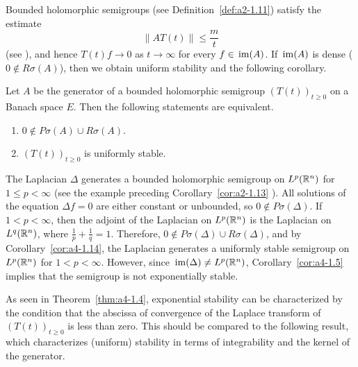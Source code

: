 Bounded holomorphic semigroups (see Definition~\ref{def:a2-1.11}) satisfy the estimate
\[\|AT(t)\| \leq \frac{m}{t}\]
(see \textcite[p.33]{goldstein:1985a}), and hence $T(t)f \to 0$ as $t \to \infty$
for every $f \in \mathop{}\mathrm{im}(A)$. 
If\/ $\mathop{}\mathrm{im}(A)$ is dense (\ie $0 \not\in R\sigma(A)$), then we obtain
uniform stability and the following corollary.
\begin{corollary}\label{cor:a4-1.14}
Let $A$ be the generator of a bounded holomorphic
semigroup $(T(t))_{t \geq 0}$ on a Banach space $E$. 
Then the following statements are equivalent.
\begin{enumerate}[\upshape (a)]
\item 
$0 \not\in P\sigma(A) \cup R\sigma(A)$.

\item 
$(T(t))_{t \geq 0}$ is uniformly stable.

\end{enumerate}
\end{corollary}
\begin{example}\label{ex:a4-15}
The Laplacian $\Delta$ generates a bounded holomorphic semigroup on $L^{p}(\mathbb{R}^{n})$ for $1 \leq p < \infty$ (see the example preceding
Corollary~\ref{cor:a2-1.13} ).
All solutions of the equation $\Delta f = 0$ are either constant
or unbounded, so $0 \not\in P\sigma(\Delta)$. 
If\/ $1 < p < \infty$, then the adjoint
of the Laplacian on $L^{p}(\mathbb{R}^{n})$ is the Laplacian on $L^{q}(\mathbb{R}^{n})$, where
$\frac{1}{p} + \frac{1}{q} = 1$. 
Therefore, $0 \not\in P\sigma(\Delta) \cup R\sigma(\Delta)$, and by Corollary~\ref{cor:a4-1.14},
the Laplacian generates a uniformly stable semigroup on  $L^{p}(\mathbb{R}^{n})$
for $1 < p < \infty$. However, since $\mathop{}\mathrm{im}( \Delta) \not= L^{p}(\mathbb{R}^{n})$, Corollary~\ref{cor:a4-1.5} implies that the semigroup is not exponentially stable. %
\end{example}
As seen in Theorem~\ref{thm:a4-1.4}, exponential stability can be characterized by the condition that the abscissa of convergence of the Laplace transform of\/ $(T(t))_{t \geq 0}$ is less than zero. 
This should be compared to the following result, which characterizes (uniform) stability in terms of integrability and the kernel of the generator.
